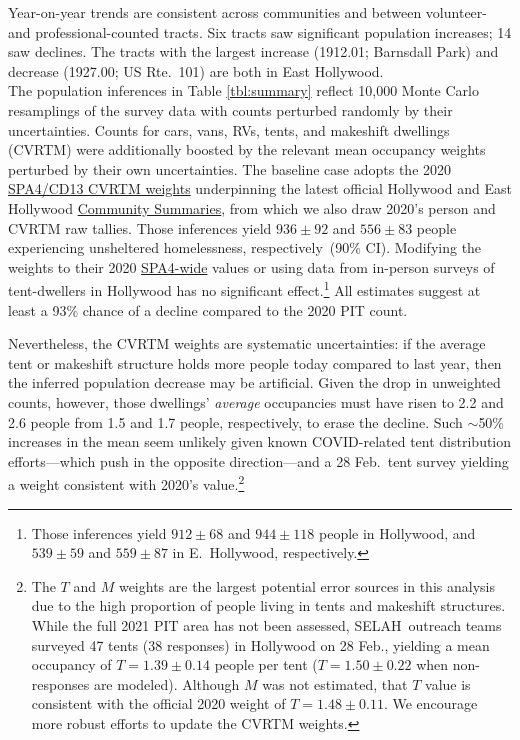 \documentclass[11pt]{article}
\def\resp{respectively}
\def\selah{SELAH}
\begin{document}
Year-on-year trends are consistent across communities and between volunteer- and professional-counted tracts.
Six tracts saw significant population increases; 14 saw declines. The tracts with the largest increase (1912.01;
Barnsdall Park) and decrease (1927.00; US Rte.\ 101) are both in East Hollywood.\\

 The population inferences in Table \ref{tbl:summary} %
reflect 10,000 Monte Carlo resamplings of the survey data with 
counts perturbed randomly by their uncertainties. Counts for cars, vans, RVs, tents, and 
makeshift dwellings (CVRTM) were additionally boosted by the relevant mean occupancy weights 
perturbed by their own uncertainties. The baseline case adopts the 2020 
\href{https://www.lahsa.org/documents?id=4635-usc-2018-2020-multipliers-and-estimates-overview}
{SPA4/CD13 CVRTM weights} underpinning the latest official Hollywood and East Hollywood 
\href{https://www.lahsa.org/documents?id=4686-2020-greater-los-angeles-city-community-homelessness-report-service-planning-area-4.pdf}
{Community Summaries}, from which we also draw 2020's person and CVRTM raw tallies. Those inferences yield 
$936\pm92$ and $556\pm83$ people experiencing unsheltered homelessness, \resp\ (90\% CI). Modifying the weights
to their 2020 \href{https://www.lahsa.org/documents?id=4693-2020-greater-los-angeles-homeless-count-cvrtm-conversion-factors}
{SPA4-wide} values or using data from in-person surveys of tent-dwellers in Hollywood has no
significant effect.\footnote{Those inferences yield $912\pm68$ and $944\pm118$ people
in Hollywood, and $539\pm59$ and $559\pm87$ in E.~Hollywood, \resp.} 
All estimates suggest at least a 93\% chance of a decline compared to the 2020 PIT count.

Nevertheless, the CVRTM weights are systematic uncertainties: if the average tent or makeshift structure holds
more people today compared to last year, then the inferred population decrease may be artificial. Given the drop in 
unweighted counts, however, those dwellings' {\it average} occupancies must have risen to 2.2 and 2.6 people 
from 1.5 and 1.7 people, \resp, to erase the decline. Such $\sim$50\% increases in the mean seem unlikely given 
known COVID-related tent distribution efforts---which push in the opposite direction---and a 28 Feb.\ tent 
survey yielding a weight consistent with 2020's value.\footnote{The $T$ and $M$ weights are the largest 
potential error sources in this analysis due to the high proportion of people living in tents and makeshift structures. 
While the full 2021 PIT area has not been assessed, \selah\ outreach teams surveyed 47 tents (38 responses) in 
Hollywood on 28 Feb., yielding a mean occupancy of $T=1.39\pm0.14$ people per tent ($T=1.50\pm0.22$ when 
non-responses are modeled). Although $M$ was not estimated, that $T$ value is consistent with the official 2020 
weight of $T=1.48\pm0.11$. We encourage more robust efforts to update the CVRTM weights.} 
\end{document}
